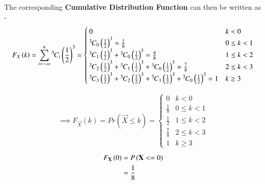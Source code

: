 \documentclass[journal]{IEEEtran}
\begin{document}
The corresponding \textbf{Cumulative Distribution Function} can then be written as - 
\begin{align}
  F_{X}\left(k\right) = \sum_{i = -\infty}^n{{}^{3}\mkern-1muC_{i}}\left(\frac{1}{2}\right)^3 = \begin{cases}
    0 & k < 0\\
    {{}^{3}\mkern-1muC_{0}}\left(\frac{1}{2}\right)^3 = \frac{1}{8} & 0 \le k < 1\\
    {{}^{3}\mkern-1muC_{1}}\left(\frac{1}{2}\right)^3 + {{}^{3}\mkern-1muC_{0}}\left(\frac{1}{2}\right)^3 = \frac{4}{8}& 1 \le k < 2\\
    {{}^{3}\mkern-1muC_{2}}\left(\frac{1}{2}\right)^3 + {{}^{3}\mkern-1muC_{1}}\left(\frac{1}{2}\right)^3 + {{}^{3}\mkern-1muC_{0}}\left(\frac{1}{2}\right)^3 = \frac{7}{8} & 2 \le k < 3\\
    {{}^{3}\mkern-1muC_{3}}\left(\frac{1}{2}\right)^3 + {{}^{3}\mkern-1muC_{2}}\left(\frac{1}{2}\right)^3 + {{}^{3}\mkern-1muC_{1}}\left(\frac{1}{2}\right)^3 + {{}^{3}\mkern-1muC_{0}}\left(\frac{1}{2}\right)^3= 1 & k \geq 3\\
  \end{cases}
\end{align}


\begin{align}
\implies F_{\vec{X}}(k) = Pr(\vec{X} \leq k) =
\begin{cases}
    0 & k < 0 \\
    \frac{1}{8} & 0 \leq k < 1 \\
    \frac{1}{2} & 1 \leq k < 2 \\
    \frac{7}{8} & 2 \leq k < 3 \\
    1 & k \geq 3
\end{cases}
\end{align}
\begin{align}
	F_{\mathbf{X}} \left(0\right) &= P \left( \mathbf{X} <= 0 \right) \\
	                     &= \frac{1}{8}
\end{align} \\
\end{document}
